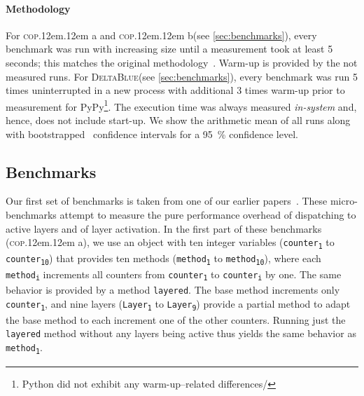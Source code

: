 \documentclass[preprint,english,10pt,nonatbib]{sigplanconf}
\DeclareRobustCommand*\copa{\textsc{cop}\kern .12em\oldstylenums{09}\kern .12em a\xspace}
\DeclareRobustCommand*\copb{\textsc{cop}\kern .12em\oldstylenums{09}\kern .12em b\xspace}
\DeclareRobustCommand*\deltablue{\textsc{DeltaBlue}\xspace}
\begin{document}
\paragraph{Methodology} 
For \copa and \copb (see \autoref{sec:benchmarks}), every benchmark was run with increasing size until a
measurement took at least 5 seconds; this matches the original
methodology~\cite{appeltauer+:2009:comparison-context-oriented}. Warm-up is
provided by the not measured runs. 
For \deltablue (see \autoref{sec:benchmarks}), every benchmark was run 5 times
uninterrupted in a new process with additional 3 times warm-up prior to
measurement for PyPy\footnote{Python did not exhibit any warm-up--related
  differences/}. The execution time was always measured \emph{in-system} and,
hence, does not include start-up. We show the arithmetic mean of all runs along
with bootstrapped~\cite{davison+:1997:confidence-intervals} confidence
intervals for a \SI{95}{\percent} confidence level.




\subsection{Benchmarks}
\label{sec:benchmarks}

Our first set of benchmarks is taken from one of our earlier
papers~\cite{appeltauer+:2009:comparison-context-oriented}. These
micro-benchmarks attempt to measure the pure performance overhead of
dispatching to active layers and of layer activation. In the first part of
these benchmarks (\copa), we use an object with ten integer variables
(\texttt{counter\textsubscript{1}} to \texttt{counter\textsubscript{10}}) that
provides ten methods (\texttt{method\textsubscript{1}} to
\texttt{method\textsubscript{10}}), where each \texttt{method\textsubscript{i}}
increments all counters from \texttt{counter\textsubscript{1}} to
\texttt{counter\textsubscript{i}} by one. The same behavior is provided by a
method \texttt{layered}. The base method increments only
\texttt{counter\textsubscript{1}}, and nine layers
(\texttt{Layer\textsubscript{1}} to \texttt{Layer\textsubscript{9}}) provide a
partial method to adapt the base method to each increment one of the other
counters. Running just the \texttt{layered} method without any layers being
active thus yields the same behavior as \texttt{method\textsubscript{1}}.
\end{document}
